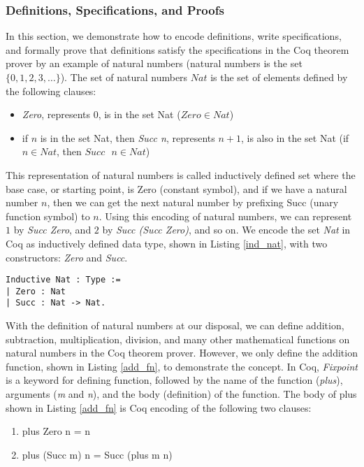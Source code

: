 \documentclass[conference,compsoc]{IEEEtran}
\begin{document}
\subsubsection*{Definitions, Specifications, and Proofs}
In this section, we demonstrate how to encode definitions, write specifications,
and formally prove that definitions satisfy the specifications 
in the Coq theorem prover by an example of 
natural numbers (natural numbers is the set $\{0, 1, 2, 3, \dots \}$). 
The set of natural numbers $Nat$ is the set of elements defined by the 
following clauses:
\begin{itemize}
  \item \emph{Zero}, represents $0$, is in the set Nat ($Zero \in Nat$)
  \item if $n$ is in the set Nat, then \emph{Succ n}, represents $n + 1$, 
    is also in the set Nat (if $n \in Nat$, then $Succ \text{ }n \in Nat$)
\end{itemize}

\noindent 
This representation of natural numbers is called 
inductively defined set where the base case, or starting point,
is Zero (constant symbol), and if we have a natural number $n$, then we can 
get the next natural number by prefixing Succ (unary function symbol) to $n$.  
Using this encoding of natural numbers, we can represent 
$1$ by \emph{Succ Zero}, and $2$ by \emph{Succ (Succ Zero)}, 
and so on. We encode the set \emph{Nat} in Coq as inductively defined data type, 
shown in Listing \ref{ind_nat}, with 
two constructors: \emph{Zero} and \emph{Succ}. 
\begin{lstlisting}[frame=single, language=Coq, caption={Definition of Natural Number},
  label={ind_nat},captionpos=t, basicstyle=\ttfamily\footnotesize,
  abovecaptionskip=-\medskipamount]
Inductive Nat : Type := 
| Zero : Nat 
| Succ : Nat -> Nat.
\end{lstlisting}


With the definition of natural numbers at our disposal,
we can define addition, subtraction, multiplication, division, and 
many other mathematical functions on natural numbers in the Coq theorem prover. 
However, we only define the addition function,
shown in Listing \ref{add_fn}, to demonstrate the concept. 
In Coq, \emph{Fixpoint} is a keyword 
for defining function, followed by the name of the function (\emph{plus}), 
arguments (\emph{m} and \emph{n}), and the body (definition) of the function.
The body of plus shown in Listing \ref{add_fn} is Coq encoding of the 
following two clauses:
\begin{enumerate}
  \item plus Zero n = n 
  \item plus (Succ m) n = Succ (plus m n)
\end{enumerate}  
\end{document}
